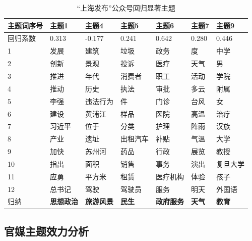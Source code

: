 \documentclass[a4paper,12pt,UTF8]{article}
\begin{document}
    \begin{table}[] \centering 
      \caption{“上海发布”公众号回归显著主题} 
      \label{tbl:shanghai-theme} 
      \begin{tabular}{@{}lllllll@{}}
      \toprule
      主题词序号 & 主题1   & 主题4    & 主题5   & 主题6   & 主题7   & 主题9   \\ \midrule
      回归系数  & 0.313 & -0.177 & 0.241 & 0.642 & 0.280 & 0.446 \\
      1     & 发展    & 建筑     & 垃圾    & 政务    & 度     & 中学    \\
      2     & 创新    & 景观     & 投诉    & 医疗    & 天气    & 男     \\
      3     & 推进    & 年代     & 消费者   & 职工    & 活动    & 学院    \\
      4     & 推动    & 历史     & 执法    & 审批    & 多云    & 附属    \\
      5     & 李强    & 违法行为   & 件     & 门诊    & 台风    & 女     \\
      6     & 建设    & 黄浦江    & 样品    & 医院    & 高温    & 治疗    \\
      7     & 习近平   & 位于     & 分类    & 护理    & 阵雨    & 汉族    \\
      8     & 产业    & 遗址     & 出租汽车  & 补贴    & 气温    & 大学    \\
      9     & 加快    & 苏州河    & 药品    & 行政    & 展览    & 教授    \\
      10    & 指出    & 面积     & 销售    & 事务    & 演出    & 复旦大学  \\
      11    & 应勇    & 平方米    & 租赁    & 医疗机构  & 体验    & 孩子    \\
      12    & 总书记   & 驾驶     & 驾驶员   & 服务    & 明天    & 外国语   \\
      归纳    & \textbf{思想政治}  & \textbf{旅游风景}   & \textbf{民生}    & \textbf{政府服务}  & \textbf{天气}    & \textbf{教育}    \\ \bottomrule
      \end{tabular}
      \end{table}

    \subsection{官媒主题效力分析}
\end{document}
